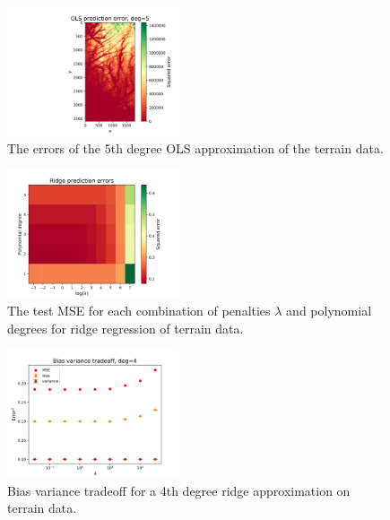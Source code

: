 \documentclass[notitlepage, reprint, nofootinbib]{revtex4-1}
\begin{document}
\begin{figure}
 	\centering
  	\includegraphics[width=0.45\textwidth]{../Figures/terrain_OLS_error_deg5.png}
  	\caption{The errors of the 5th degree OLS approximation of the terrain data.}
	\label{fig17}
\end{figure}


\begin{figure}
	\centering
	\includegraphics[width=0.45\textwidth]{../Figures/ridge_grid_search.png}
	\caption{The test MSE for each combination of penalties $\lambda$ and polynomial degrees for ridge regression of terrain data.}
	\label{fig18}
\end{figure}

\clearpage

\begin{figure}
	\centering
	\includegraphics[width=0.45\textwidth]{../Figures/b-v_tradeoff_terrain_ridge_deg4.png}
	\caption{Bias variance tradeoff for a 4th degree ridge approximation on terrain data.}
	\label{fig19}
\end{figure}
\end{document}
